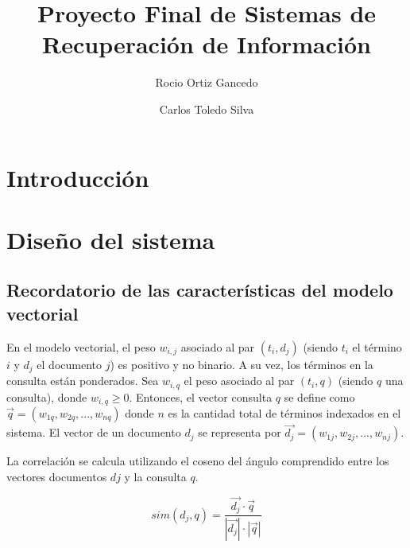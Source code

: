 \documentclass[runningheads]{llncs}
\begin{document}
	\hyphenation{}
	
	\title{Proyecto Final de Sistemas de Recuperaci\'on de Informaci\'on}
	
	\author{Rocio Ortiz Gancedo \and Carlos Toledo Silva}
	
	
	
	\maketitle
	
	\begin{abstract}
		
	\end{abstract}

	\section{Introducci\'on}

	\section{Dise\~{n}o del sistema}
	
	\subsection{Recordatorio de las caracter\'isticas del modelo vectorial}
	
	En el modelo vectorial, el peso $w_{i,j}$ asociado al par $(t_i,d_j)$ (siendo $t_i$ el t\'ermino $i$ y $d_j$ el documento $j$) es positivo y no binario. A su vez, los t\'erminos en la consulta est\'an ponderados. Sea $w_{i,q}$ el peso asociado al par $(t_i,q)$ (siendo $q$ una consulta), donde $w_{i,q}\geq 0$. Entonces, el vector consulta $q$ se define como $\overrightarrow{q}=(w_{1q},w_{2q},...,w_{nq})$ donde $n$ es la cantidad total de t\'erminos indexados en el sistema. El vector de un documento $d_j$ se representa por $\overrightarrow{d_j}=(w_{1j},w_{2j},...,w_{nj})$.
	
	La correlaci\'on se calcula utilizando el coseno del \'angulo comprendido entre los vectores documentos $dj$ y la consulta $q$.
	
	\begin{equation}
		sim(d_j,q)=\frac{\overrightarrow{d_j}\cdot\overrightarrow{q}}{|\overrightarrow{d_j}|\cdot|\overrightarrow{q}|}
	\end{equation}
\end{document}
